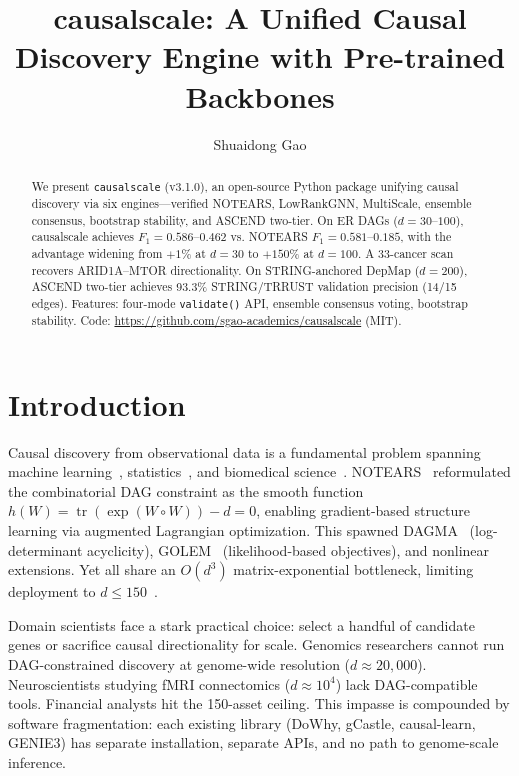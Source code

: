 \documentclass[sigconf,review]{acmart}
\title[causalscale]{causalscale: A Unified Causal Discovery Engine with Pre-trained Backbones}
\author{Shuaidong Gao}
\affiliation{\institution{Chongqing Institute of Foreign Studies}\city{Qijiang}\country{China}}
\begin{document}
\begin{abstract}
We present \texttt{causalscale} (v3.1.0), an open-source Python package unifying causal discovery via six engines---verified NOTEARS, LowRankGNN, MultiScale, ensemble consensus, bootstrap stability, and ASCEND two-tier. On ER DAGs ($d{=}30$--$100$), causalscale achieves $F_1{=}0.586$--$0.462$ vs. NOTEARS $F_1{=}0.581$--$0.185$, with the advantage widening from $+1\%$ at $d{=}30$ to $+150\%$ at $d{=}100$. A 33-cancer scan recovers ARID1A--MTOR directionality. On STRING-anchored DepMap ($d{=}200$), ASCEND two-tier achieves 93.3\% STRING/TRRUST validation precision (14/15 edges). Features: four-mode \texttt{validate()} API, ensemble consensus voting, bootstrap stability. Code: \url{https://github.com/sgao-academics/causalscale} (MIT).
\end{abstract}
\maketitle

\section{Introduction}

Causal discovery from observational data is a fundamental problem spanning machine learning~\cite{zheng2018dag}, statistics~\cite{pearl2009causality}, and biomedical science~\cite{glymour2019review}. NOTEARS~\cite{zheng2018dag} reformulated the combinatorial DAG constraint as the smooth function $h(W)=\operatorname{tr}(\exp(W \circ W))-d=0$, enabling gradient-based structure learning via augmented Lagrangian optimization. This spawned DAGMA~\cite{bello2022dagma} (log-determinant acyclicity), GOLEM~\cite{ng2020golem} (likelihood-based objectives), and nonlinear extensions. Yet all share an $O(d^3)$ matrix-exponential bottleneck, limiting deployment to $d\le150$~\cite{gao2025diagnostic}.

Domain scientists face a stark practical choice: select a handful of candidate genes or sacrifice causal directionality for scale. Genomics researchers cannot run DAG-constrained discovery at genome-wide resolution ($d\approx20{,}000$). Neuroscientists studying fMRI connectomics ($d\approx10^4$) lack DAG-compatible tools. Financial analysts hit the 150-asset ceiling. This impasse is compounded by software fragmentation: each existing library (DoWhy, gCastle, causal-learn, GENIE3) has separate installation, separate APIs, and no path to genome-scale inference.
\end{document}
